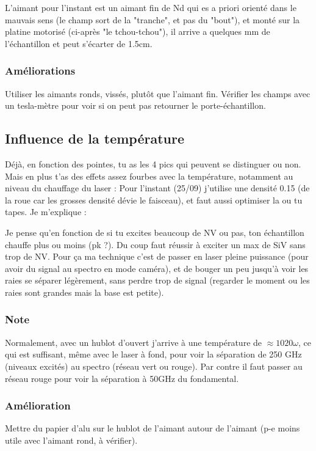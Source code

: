 \documentclass[a4paper]{report}
\begin{document}
  L'aimant pour l'instant est un aimant fin de Nd qui es a priori orienté dans le mauvais sens (le champ sort de la "tranche", et pas du "bout"), et monté sur la platine motorisé (ci-après "le tchou-tchou"), il arrive a quelques mm de l'échantillon et peut s'écarter de 1.5cm.
  
  \subsubsection{Améliorations}
  Utiliser les aimants ronds, vissés, plutôt que l'aimant fin. Vérifier les champs avec un tesla-mètre pour voir si on peut pas retourner le porte-échantillon.
  
  \subsection{Influence de la température}
  Déjà, en fonction des pointes, tu as les 4 pics qui peuvent se distinguer ou non. Mais en plus t'as des effets assez fourbes avec la température, notamment au niveau du chauffage du laser : Pour l'instant (25/09) j'utilise une densité 0.15 (de la roue car les grosses densité dévie le faisceau), et faut aussi optimiser la ou tu tapes. Je m'explique :
  
  Je pense qu'en fonction de si tu excites beaucoup de NV ou pas, ton échantillon chauffe plus ou moins (pk ?). Du coup faut réussir à exciter un max de SiV sans trop de NV. Pour ça ma technique c'est de passer en laser pleine puissance (pour avoir du signal au spectro en mode caméra), et de bouger un peu jusqu'à voir les raies se séparer légèrement, sans perdre trop de signal (regarder le moment ou les raies sont grandes mais la base est petite).
  
  \subsubsection{Note}
  Normalement, avec un hublot d'ouvert j'arrive à une température de $\approx 1020 \omega $, ce qui est suffisant, même avec le laser à fond, pour voir la séparation de 250 GHz (niveaux excités) au spectro (réseau vert ou rouge). Par contre il faut passer au réseau rouge pour voir la séparation à 50GHz du fondamental.
  
  
  
  \subsubsection{Amélioration}
  Mettre du papier d'alu sur le hublot de l'aimant autour de l'aimant (p-e moins utile avec l'aimant rond, à vérifier).
  
\end{document}
